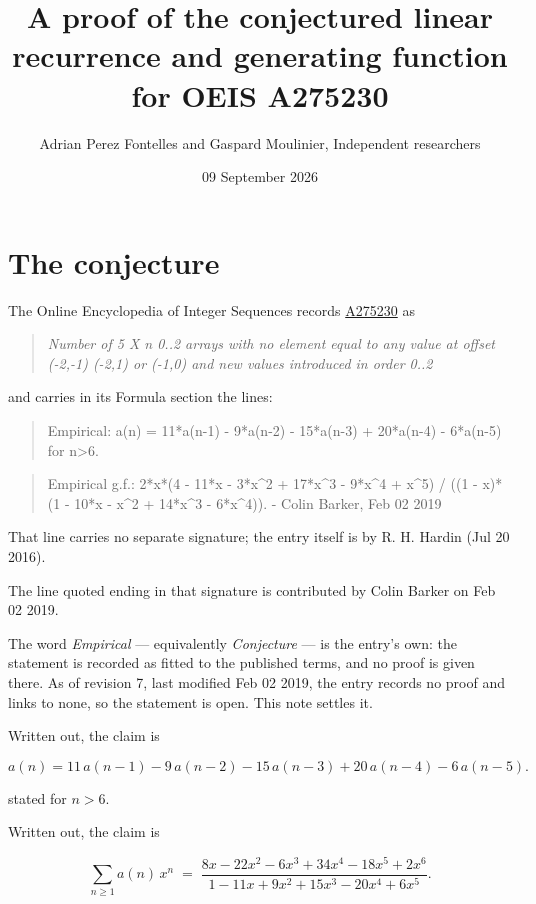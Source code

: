 \documentclass[11pt]{article}
\title{A proof of the conjectured linear recurrence and generating function for OEIS A275230}
\author{Adrian Perez Fontelles and Gaspard Moulinier, Independent researchers}
\date{09 September 2026}
\theoremstyle{definition}
\begin{document}
\maketitle
\section{The conjecture}

The Online Encyclopedia of Integer Sequences records \href{https://oeis.org/A275230}{A275230} as

\begin{quote}\itshape Number of 5 X n 0..2 arrays with no element equal to any value at offset (-2,-1) (-2,1) or (-1,0) and new values introduced in order 0..2\end{quote}

and carries in its Formula section the lines:

\begin{quote}\ttfamily Empirical: a(n) = 11*a(n-1) - 9*a(n-2) - 15*a(n-3) + 20*a(n-4) - 6*a(n-5) for n>6.\end{quote}

\begin{quote}\ttfamily Empirical g.f.: 2*x*(4 - 11*x - 3*x\textasciicircum{}2 + 17*x\textasciicircum{}3 - 9*x\textasciicircum{}4 + x\textasciicircum{}5) / ((1 - x)*(1 - 10*x - x\textasciicircum{}2 + 14*x\textasciicircum{}3 - 6*x\textasciicircum{}4)). - Colin Barker, Feb 02 2019\end{quote}

That line carries no separate signature; the entry itself is by R. H. Hardin (Jul 20 2016).

The line quoted ending in that signature is contributed by Colin Barker on Feb 02 2019.

The word {\itshape Empirical} --- equivalently {\itshape Conjecture} --- is the entry's own: the statement is recorded as fitted to the published terms, and no proof is given there. As of revision 7, last modified Feb 02 2019, the entry records no proof and links to none, so the statement is open. This note settles it.

Written out, the claim is

\[a(n) = 11\,a(n-1) - 9\,a(n-2) - 15\,a(n-3) + 20\,a(n-4) - 6\,a(n-5).\]

stated for $n > 6$.

Written out, the claim is

\[\sum_{n \ge 1} a(n)\,x^n \;=\; \frac{8x - 22x^{2} - 6x^{3} + 34x^{4} - 18x^{5} + 2x^{6}}{1 - 11x + 9x^{2} + 15x^{3} - 20x^{4} + 6x^{5}}.\]
\end{document}

